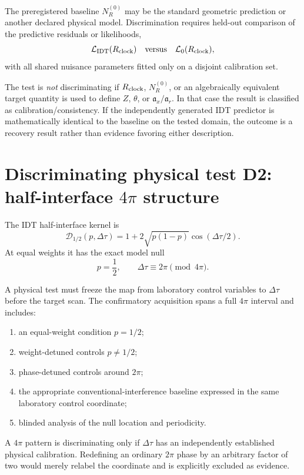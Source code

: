 The preregistered baseline \(N_R^{(0)}\) may be the standard geometric prediction or another declared physical model. Discrimination requires held-out comparison of the predictive residuals or likelihoods,
\[
\mathcal L_{\rm IDT}(R_{\rm clock})
\quad\text{versus}\quad
\mathcal L_{0}(R_{\rm clock}),
\]
with all shared nuisance parameters fitted only on a disjoint calibration set.

The test is \emph{not} discriminating if \(R_{\rm clock}\), \(N_R^{(0)}\), or an algebraically equivalent target quantity is used to define \(Z\), \(\theta\), or \(\mathfrak a_x/\mathfrak a_r\). In that case the result is classified as calibration/consistency. If the independently generated IDT predictor is mathematically identical to the baseline on the tested domain, the outcome is a recovery result rather than evidence favoring either description.

\section{Discriminating physical test D2: half-interface \(4\pi\) structure}

The IDT half-interface kernel is
\[
\boxed{
\mathcal D_{1/2}(p,\Delta\tau)
=
1+2\sqrt{p(1-p)}\cos(\Delta\tau/2).
}
\]
At equal weights it has the exact model null
\[
p=\frac12,
\qquad
\Delta\tau\equiv2\pi\pmod{4\pi}.
\]

A physical test must freeze the map from laboratory control variables to \(\Delta\tau\) before the target scan. The confirmatory acquisition spans a full \(4\pi\) interval and includes:
\begin{enumerate}
\item an equal-weight condition \(p=1/2\);
\item weight-detuned controls \(p\neq1/2\);
\item phase-detuned controls around \(2\pi\);
\item the appropriate conventional-interference baseline expressed in the same laboratory control coordinate;
\item blinded analysis of the null location and periodicity.
\end{enumerate}

A \(4\pi\) pattern is discriminating only if \(\Delta\tau\) has an independently established physical calibration. Redefining an ordinary \(2\pi\) phase by an arbitrary factor of two would merely relabel the coordinate and is explicitly excluded as evidence.

